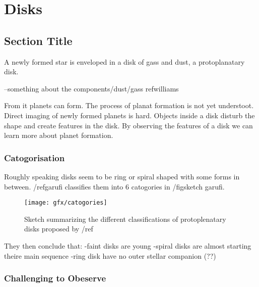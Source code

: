 
\chapter{Disks} %

\label{ch:disks} %


\section{Section Title}

A newly formed star is enveloped in a disk of gass and dust, a protoplanatary disk.

--something about the components/dust/gass ref{williams}

From it planets can form. The process of planat formation is not yet understoot. Direct imaging of newly formed planets is hard. Objects inside a disk disturb the shape and create features in the disk. By observing the features of a disk we can learn more about planet formation.


\subsection{Catogorisation}

Roughly speaking disks seem to be ring or spiral shaped with some forms in between. /ref{garufi} classifies them into 6 catogories in /fig{sketch garufi}. 

\begin{figure}[h]
    \label{catagories}
    \caption{Sketch summarizing the different classifications of protoplenatary disks proposed by /ref}
    \centering
    \texttt{[image: gfx/catogories]}
\end{figure}

They then conclude that: 
-faint disks are young
-spiral disks are almost starting theire main sequence
-ring disk have no outer stellar companion (??)  


\subsection{Challenging to Obeserve}


